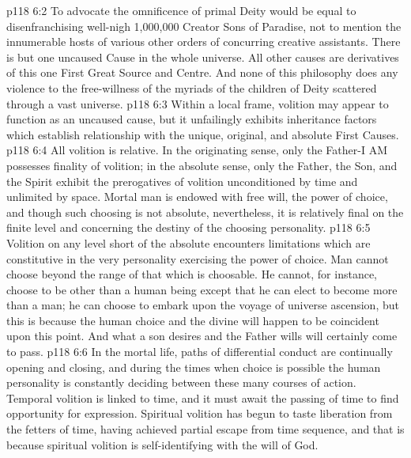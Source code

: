 \vs p118 6:2 To advocate the omnificence of primal Deity would be equal to disenfranchising well\hyp{}nigh 1,000,000 Creator Sons of Paradise, not to mention the innumerable hosts of various other orders of concurring creative assistants. There is but one uncaused Cause in the whole universe. All other causes are derivatives of this one First Great Source and Centre. And none of this philosophy does any violence to the free\hyp{}willness of the myriads of the children of Deity scattered through a vast universe.
\vs p118 6:3 \pc Within a local frame, volition may appear to function as an uncaused cause, but it unfailingly exhibits inheritance factors which establish relationship with the unique, original, and absolute First Causes.
\vs p118 6:4 All volition is relative. In the originating sense, only the Father\hyp{}I AM possesses finality of volition; in the absolute sense, only the Father, the Son, and the Spirit exhibit the prerogatives of volition unconditioned by time and unlimited by space. Mortal man is endowed with free will, the power of choice, and though such choosing is not absolute, nevertheless, it is relatively final on the finite level and concerning the destiny of the choosing personality.
\vs p118 6:5 Volition on any level short of the absolute encounters limitations which are constitutive in the very personality exercising the power of choice. Man cannot choose beyond the range of that which is choosable. He cannot, for instance, choose to be other than a human being except that he can elect to become more than a man; he can choose to embark upon the voyage of universe ascension, but this is because the human choice and the divine will happen to be coincident upon this point. And what a son desires and the Father wills will certainly come to pass.
\vs p118 6:6 In the mortal life, paths of differential conduct are continually opening and closing, and during the times when choice is possible the human personality is constantly deciding between these many courses of action. Temporal volition is linked to time, and it must await the passing of time to find opportunity for expression. Spiritual volition has begun to taste liberation from the fetters of time, having achieved partial escape from time sequence, and that is because spiritual volition is self\hyp{}identifying with the will of God.
